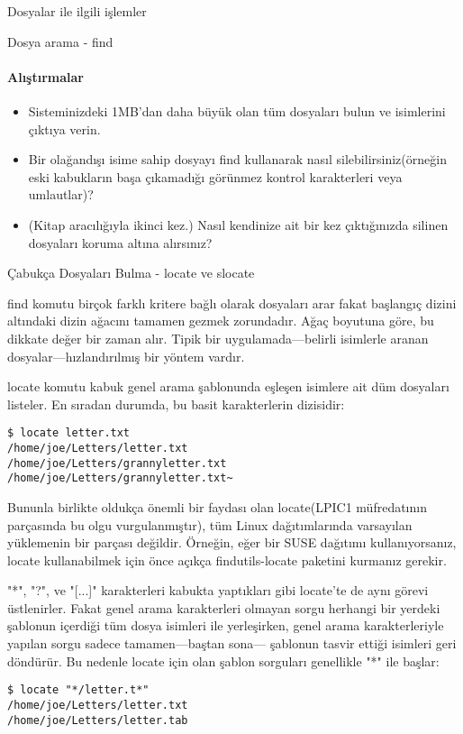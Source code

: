 \begin{section}{Dosyalar ile ilgili işlemler}
\begin{subsection}{Dosya arama - find}
\paragraph{Alıştırmalar}{
\begin{itemize}
 \item Sisteminizdeki 1MB'dan daha büyük olan tüm dosyaları bulun ve isimlerini çıktıya verin.
 \item Bir olağandışı isime sahip dosyayı find kullanarak nasıl silebilirsiniz(örneğin eski kabukların başa çıkamadığı görünmez kontrol karakterleri veya umlautlar)?
 \item (Kitap aracılığıyla ikinci kez.) Nasıl kendinize ait bir kez çıktığınızda silinen dosyaları koruma altına alırsınız?
\end{itemize}}
\end{subsection}
\begin{subsection}{Çabukça Dosyaları Bulma - locate ve slocate}

find komutu birçok farklı kritere bağlı olarak dosyaları arar fakat başlangıç dizini altındaki dizin ağacını tamamen gezmek zorundadır. Ağaç boyutuna göre, bu dikkate değer bir zaman alır. Tipik bir uygulamada—belirli isimlerle aranan dosyalar—hızlandırılmış bir yöntem vardır.

locate komutu kabuk genel arama şablonunda eşleşen isimlere ait düm dosyaları listeler. En sıradan durumda, bu basit karakterlerin dizisidir:
\begin{verbatim}
$ locate letter.txt
/home/joe/Letters/letter.txt
/home/joe/Letters/grannyletter.txt
/home/joe/Letters/grannyletter.txt~
\end{verbatim}

Bununla birlikte oldukça önemli bir faydası olan locate(LPIC1 müfredatının parçasında bu olgu vurgulanmıştır), tüm Linux dağıtımlarında varsayılan yüklemenin bir parçası değildir. Örneğin, eğer bir SUSE dağıtımı kullanıyorsanız, locate kullanabilmek için önce açıkça findutils-locate paketini kurmanız gerekir.

"*", "?", ve "[...]" karakterleri kabukta yaptıkları gibi locate'te de aynı görevi üstlenirler. Fakat genel arama karakterleri olmayan sorgu herhangi bir yerdeki şablonun içerdiği tüm dosya isimleri ile yerleşirken, genel arama karakterleriyle yapılan sorgu sadece tamamen—baştan sona— şablonun tasvir ettiği isimleri geri döndürür. Bu nedenle locate için olan şablon sorguları genellikle "*" ile başlar:
\begin{verbatim}
$ locate "*/letter.t*"
/home/joe/Letters/letter.txt
/home/joe/Letters/letter.tab
\end{verbatim}


\end{subsection}
\end{section}
